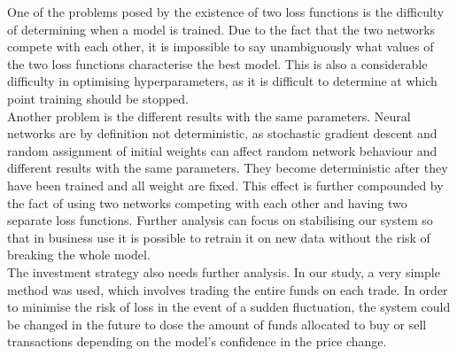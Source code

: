 \documentclass[11pt]{article} %
\begin{document}
One of the problems posed by the existence of two loss functions is the difficulty of determining when a model is trained. Due to the fact that the two networks compete with each other, it is impossible to say unambiguously what values of the two loss functions characterise the best model. This is also a considerable difficulty in optimising hyperparameters, as it is difficult to determine at which point training should be stopped. \\

Another problem is the different results with the same parameters. Neural networks are by definition not deterministic, as stochastic gradient descent and random assignment of initial weights can affect random network behaviour and different results with the same parameters. They become deterministic after they have been trained and all weight are fixed. This effect is further compounded by the fact of using two networks competing with each other and having two separate loss functions. Further analysis can focus on stabilising our system so that in business use it is possible to retrain it on new data without the risk of breaking the whole model. \\

The investment strategy also needs further analysis. In our study, a very simple method was used, which involves trading the entire funds on each trade. In order to minimise the risk of loss in the event of a sudden fluctuation, the system could be changed in the future to dose the amount of funds allocated to buy or sell transactions depending on the model's confidence in the price change. 
\end{document}
